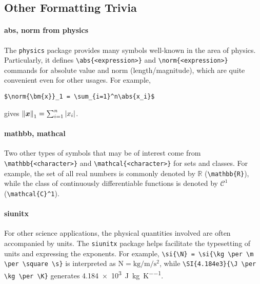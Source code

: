 \subsection{Other Formatting Trivia}

\paragraph{abs, norm from physics}
The \verb|physics| package provides many symbols well-known in the area of physics. Particularly, it defines \texttt{\textbackslash abs\{<expression>\}} and \texttt{\textbackslash norm\{<expression>\}} commands for absolute value and norm (length/magnitude), which are quite convenient even for other usages. For example, 
\begin{lstlisting}
$\norm{\bm{x}}_1 = \sum_{i=1}^n\abs{x_i}$
\end{lstlisting}
gives $\norm{\bm{x}}_1 = \sum_{i=1}^n\abs{x_i}$.

\paragraph{mathbb, mathcal}
Two other types of symbols that may be of interest come from \texttt{\textbackslash mathbb\{<character>\}} and \texttt{\textbackslash mathcal\{<character>\}} for sets and classes. For example, the set of all real numbers is commonly denoted by $\mathbb{R}$ (\texttt{\textbackslash mathbb\{R\}}), while the class of continuously differentiable functions is denoted by $\mathcal{C}^1$ (\texttt{\textbackslash mathcal\{C\}\^{}1}).

\paragraph{siunitx}
For other science applications, the physical quantities involved are often accompanied by units. The \verb|siunitx| package helps facilitate the typesetting of units and expressing the exponents. For example, \texttt{\textbackslash si\{\textbackslash N\} = \textbackslash si\{\textbackslash kg \textbackslash per \textbackslash m \textbackslash per \textbackslash square \textbackslash s\}} is interpreted as $\si{\N} = \si{\kg \per \m \per \square \s}$, while \texttt{\textbackslash SI\{4.184e3\}\allowbreak\{\textbackslash J \textbackslash per \textbackslash kg \textbackslash per \textbackslash K\}} generates \SI{4.184e3}{\J \per \kg \per \K}.


